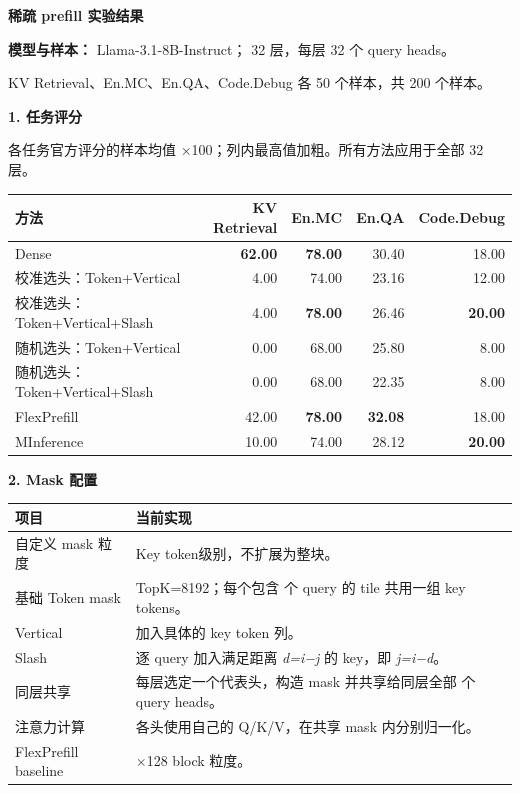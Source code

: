 \documentclass[11pt,a4paper]{article}
\newcommand{\zh}[1]{{\CJKfont #1}}
\newcommand{\en}[1]{{\rmfamily #1}}
\begin{document}
\begin{center}
  {\Large\bfseries\zh{稀疏} prefill \zh{实验结果}}
\end{center}

{\bfseries\zh{模型与样本：}} Llama-3.1-8B-Instruct\zh{；}
32 \zh{层，每层} 32 \zh{个} query heads\zh{。}\par
KV Retrieval\zh{、}En.MC\zh{、}En.QA\zh{、}Code.Debug
\zh{各} 50 \zh{个样本，共} 200 \zh{个样本。}

\vspace{5pt}
{\large\bfseries 1. \zh{任务评分}}

\zh{各任务官方评分的样本均值} ×100\zh{；列内最高值加粗。所有方法应用于全部} 32 \zh{层。}

\begingroup
\setlength{\tabcolsep}{5pt}
\begin{tabularx}{\textwidth}{@{}Xrrrr@{}}
\toprule
\textbf{\zh{方法}} & \textbf{KV Retrieval} & \textbf{En.MC} & \textbf{En.QA} & \textbf{Code.Debug} \\
\midrule
Dense & \textbf{62.00} & \textbf{78.00} & 30.40 & 18.00 \\
\zh{校准选头：}Token+Vertical & 4.00 & 74.00 & 23.16 & 12.00 \\
\zh{校准选头：}Token+Vertical+Slash & 4.00 & \textbf{78.00} & 26.46 & \textbf{20.00} \\
\zh{随机选头：}Token+Vertical & 0.00 & 68.00 & 25.80 & 8.00 \\
\zh{随机选头：}Token+Vertical+Slash & 0.00 & 68.00 & 22.35 & 8.00 \\
FlexPrefill & 42.00 & \textbf{78.00} & \textbf{32.08} & 18.00 \\
MInference & 10.00 & 74.00 & 28.12 & \textbf{20.00} \\
\bottomrule
\end{tabularx}
\endgroup

\vspace{3pt}
{\large\bfseries 2. Mask \zh{配置}}

\begin{tabularx}{\textwidth}{@{}p{32mm}X@{}}
\toprule
\textbf{\zh{项目}} & \textbf{\zh{当前实现}} \\
\midrule
\zh{自定义} mask \zh{粒度} & Key token\zh{级别，不扩展为整块。} \\
\zh{基础} Token mask & \en{TopK=8192}\zh{；每个包含} \en{128} \zh{个} \en{query} \zh{的} \en{tile} \zh{共用一组} \en{key tokens}\zh{。} \\
Vertical & \zh{加入具体的} \en{key token} \zh{列。} \\
Slash & \zh{逐} \en{query} \zh{加入满足距离} \en{\textit{d=i−j}} \zh{的} \en{key}\zh{，即} \en{\textit{j=i−d}}\zh{。} \\
\zh{同层共享} & \zh{每层选定一个代表头，构造} \en{mask} \zh{并共享给同层全部} \en{32} \zh{个} \en{query heads}\zh{。} \\
\zh{注意力计算} & \zh{各头使用自己的} \en{Q/K/V}\zh{，在共享} \en{mask} \zh{内分别归一化。} \\
FlexPrefill baseline & \en{128×128 block} \zh{粒度。} \\
\bottomrule
\end{tabularx}
\end{document}
